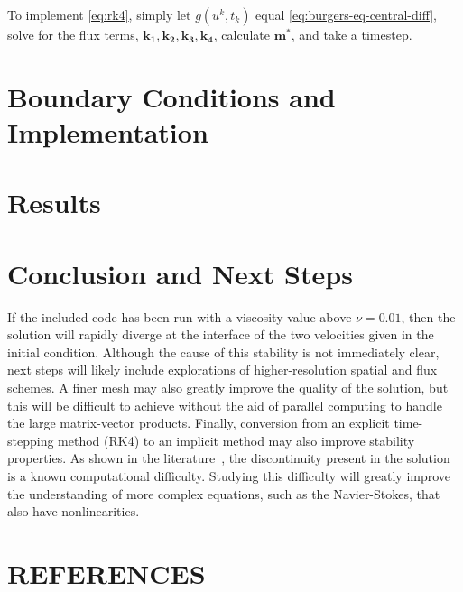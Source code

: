 \documentclass[ltr]{ornltm} %
\numberwithin{equation}{section}
\begin{document}
	To implement \cref{eq:rk4}, simply let $g(u^k,t_k)$ equal \cref{eq:burgers-eq-central-diff}, solve for the flux terms, $\mathbf{k_1},\mathbf{k_2},\mathbf{k_3},\mathbf{k_4}$, calculate $\mathbf{m^*}$, and take a timestep.


	\section{Boundary Conditions and Implementation}\label{sec:boundary-conditions-and-implementation}
	


	\section{Results}\label{sec:results}
	
	\clearpage


	\section{Conclusion and Next Steps}\label{sec:conclusion}
	If the included code has been run with a viscosity value above $\nu=0.01$, then the solution will rapidly diverge at the interface of the two velocities given in the initial condition.
	Although the cause of this stability is not immediately clear, next steps will likely include explorations of higher-resolution spatial and flux schemes.
	A finer mesh may also greatly improve the quality of the solution, but this will be difficult to achieve without the aid of parallel computing to handle the large matrix-vector products.
	Finally, conversion from an explicit time-stepping method (RK4) to an implicit method may also improve stability properties.
	As shown in the literature~\autocite{cameronNOTESBURGERSEQUATION,salihBurgersEquation2016}, the discontinuity present in the solution is a known computational difficulty.
	Studying this difficulty will greatly improve the understanding of more complex equations, such as the Navier-Stokes, that also have nonlinearities.





	\section{REFERENCES}%
	\printbibliography[heading=none]%
\end{document}
